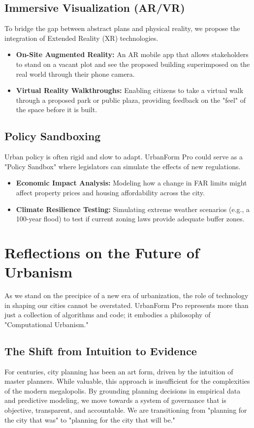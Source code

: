 \documentclass[12pt,a4paper]{report}
\begin{document}
\subsection{Immersive Visualization (AR/VR)}
To bridge the gap between abstract plans and physical reality, we propose the integration of Extended Reality (XR) technologies.
\begin{itemize}
    \item \textbf{On-Site Augmented Reality:} An AR mobile app that allows stakeholders to stand on a vacant plot and see the proposed building superimposed on the real world through their phone camera.
    \item \textbf{Virtual Reality Walkthroughs:} Enabling citizens to take a virtual walk through a proposed park or public plaza, providing feedback on the "feel" of the space before it is built.
\end{itemize}

\subsection{Policy Sandboxing}
Urban policy is often rigid and slow to adapt. UrbanForm Pro could serve as a "Policy Sandbox" where legislators can simulate the effects of new regulations.
\begin{itemize}
    \item \textbf{Economic Impact Analysis:} Modeling how a change in FAR limits might affect property prices and housing affordability across the city.
    \item \textbf{Climate Resilience Testing:} Simulating extreme weather scenarios (e.g., a 100-year flood) to test if current zoning laws provide adequate buffer zones.
\end{itemize}

\section{Reflections on the Future of Urbanism}
As we stand on the precipice of a new era of urbanization, the role of technology in shaping our cities cannot be overstated. UrbanForm Pro represents more than just a collection of algorithms and code; it embodies a philosophy of "Computational Urbanism."

\subsection{The Shift from Intuition to Evidence}
For centuries, city planning has been an art form, driven by the intuition of master planners. While valuable, this approach is insufficient for the complexities of the modern megalopolis. By grounding planning decisions in empirical data and predictive modeling, we move towards a system of governance that is objective, transparent, and accountable. We are transitioning from "planning for the city that was" to "planning for the city that will be."
\end{document}
